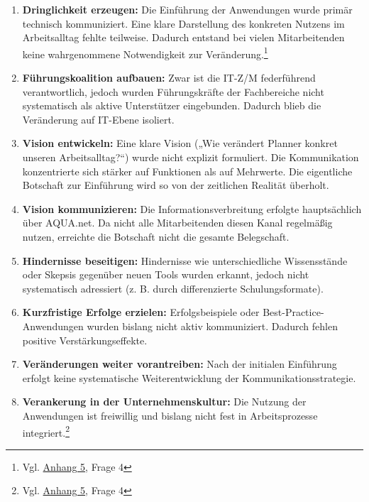 \documentclass[
    12pt, 
    a4paper,
    ]{scrartcl} %
\begin{document}
\begin{enumerate}
    \setlength\itemsep{0.4\baselineskip}
    \setlength\parskip{0pt}
    \setlength\parsep{0pt}
\item \textbf{Dringlichkeit erzeugen:} Die Einführung der Anwendungen wurde primär technisch kommuniziert. Eine klare Darstellung des konkreten Nutzens im Arbeitsalltag fehlte teilweise. Dadurch entstand bei vielen Mitarbeitenden keine wahrgenommene Notwendigkeit zur Veränderung.\footnote{Vgl. \hyperref[sec:Anhang5]{Anhang 5}, Frage 4}

\item \textbf{Führungskoalition aufbauen:} Zwar ist die IT-Z/M federführend verantwortlich, jedoch wurden Führungskräfte der Fachbereiche nicht systematisch als aktive Unterstützer eingebunden. Dadurch blieb die Veränderung auf IT-Ebene isoliert.

\item \textbf{Vision entwickeln:} Eine klare Vision („Wie verändert Planner konkret unseren Arbeitsalltag?“) wurde nicht explizit formuliert. Die Kommunikation konzentrierte sich stärker auf Funktionen als auf Mehrwerte. Die eigentliche Botschaft zur Einführung wird so von der zeitlichen Realität überholt.

\item \textbf{Vision kommunizieren:} Die Informationsverbreitung erfolgte hauptsächlich über AQUA.net. Da nicht alle Mitarbeitenden diesen Kanal regelmäßig nutzen, erreichte die Botschaft nicht die gesamte Belegschaft.

\item \textbf{Hindernisse beseitigen:} Hindernisse wie unterschiedliche Wissensstände oder Skepsis gegenüber neuen Tools wurden erkannt, jedoch nicht systematisch adressiert (z. B. durch differenzierte Schulungsformate).

\item \textbf{Kurzfristige Erfolge erzielen:} Erfolgsbeispiele oder Best-Practice-Anwendungen wurden bislang nicht aktiv kommuniziert. Dadurch fehlen positive Verstärkungseffekte.

\item \textbf{Veränderungen weiter vorantreiben:} Nach der initialen Einführung erfolgt keine systematische Weiterentwicklung der Kommunikationsstrategie.

\item \textbf{Verankerung in der Unternehmenskultur:} Die Nutzung der Anwendungen ist freiwillig und bislang nicht fest in Arbeitsprozesse integriert.\footnote{Vgl. \hyperref[sec:Anhang5]{Anhang 5}, Frage 4}

\end{enumerate}
\end{document}
